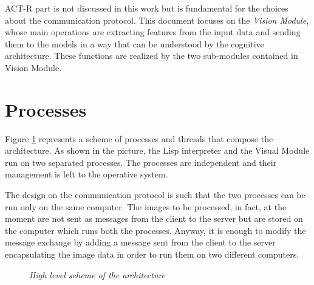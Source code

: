 	\mbox{ACT-R} part is not discussed in this work but is fundamental for the choices about the communication protocol.
	This document focuses on the \emph{Vision Module}, whose main operations are extracting features from the input data and sending them to the models in a way that can be understood by the cognitive architecture. 
	These functions are realized by the two sub-modules contained in Vision Module.

	\section{Processes}
	Figure \ref{fig:processes} represents a scheme of processes and threads that compose the architecture.
	As shown in the picture, the \mbox{Lisp} interpreter and the Visual Module run on two separated processes. 
	The processes are independent and their management is left to the operative system.

	The design on the communication protocol is such that the two processes can be run only on the same computer. 
	The images to be processed, in fact, at the moment are not sent as messages from the client to the server but are stored on the computer which runs both the processes.
	Anyway, it is enough to modify the message exchange by adding a message sent from the client to the server encapsulating the image data in order to run them on two different computers.
	
	\begin{figure}[h]
	  \begin{center} 
	  \end{center} 
	  \caption{\textit{High level scheme of the architecture}}  
	  \label{fig:processes}
 	\end{figure}

